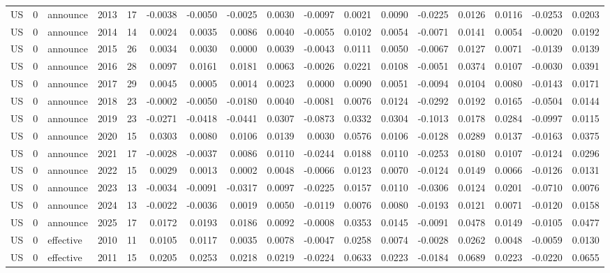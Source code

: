\begin{tabular}{lrlrrrrrrrrrrrrrr}
US & 0 & announce & 2013 & 17 & -0.0038 & -0.0050 & -0.0025 & 0.0030 & -0.0097 & 0.0021 & 0.0090 & -0.0225 & 0.0126 & 0.0116 & -0.0253 & 0.0203 \\
US & 0 & announce & 2014 & 14 & 0.0024 & 0.0035 & 0.0086 & 0.0040 & -0.0055 & 0.0102 & 0.0054 & -0.0071 & 0.0141 & 0.0054 & -0.0020 & 0.0192 \\
US & 0 & announce & 2015 & 26 & 0.0034 & 0.0030 & 0.0000 & 0.0039 & -0.0043 & 0.0111 & 0.0050 & -0.0067 & 0.0127 & 0.0071 & -0.0139 & 0.0139 \\
US & 0 & announce & 2016 & 28 & 0.0097 & 0.0161 & 0.0181 & 0.0063 & -0.0026 & 0.0221 & 0.0108 & -0.0051 & 0.0374 & 0.0107 & -0.0030 & 0.0391 \\
US & 0 & announce & 2017 & 29 & 0.0045 & 0.0005 & 0.0014 & 0.0023 & 0.0000 & 0.0090 & 0.0051 & -0.0094 & 0.0104 & 0.0080 & -0.0143 & 0.0171 \\
US & 0 & announce & 2018 & 23 & -0.0002 & -0.0050 & -0.0180 & 0.0040 & -0.0081 & 0.0076 & 0.0124 & -0.0292 & 0.0192 & 0.0165 & -0.0504 & 0.0144 \\
US & 0 & announce & 2019 & 23 & -0.0271 & -0.0418 & -0.0441 & 0.0307 & -0.0873 & 0.0332 & 0.0304 & -0.1013 & 0.0178 & 0.0284 & -0.0997 & 0.0115 \\
US & 0 & announce & 2020 & 15 & 0.0303 & 0.0080 & 0.0106 & 0.0139 & 0.0030 & 0.0576 & 0.0106 & -0.0128 & 0.0289 & 0.0137 & -0.0163 & 0.0375 \\
US & 0 & announce & 2021 & 17 & -0.0028 & -0.0037 & 0.0086 & 0.0110 & -0.0244 & 0.0188 & 0.0110 & -0.0253 & 0.0180 & 0.0107 & -0.0124 & 0.0296 \\
US & 0 & announce & 2022 & 15 & 0.0029 & 0.0013 & 0.0002 & 0.0048 & -0.0066 & 0.0123 & 0.0070 & -0.0124 & 0.0149 & 0.0066 & -0.0126 & 0.0131 \\
US & 0 & announce & 2023 & 13 & -0.0034 & -0.0091 & -0.0317 & 0.0097 & -0.0225 & 0.0157 & 0.0110 & -0.0306 & 0.0124 & 0.0201 & -0.0710 & 0.0076 \\
US & 0 & announce & 2024 & 13 & -0.0022 & -0.0036 & 0.0019 & 0.0050 & -0.0119 & 0.0076 & 0.0080 & -0.0193 & 0.0121 & 0.0071 & -0.0120 & 0.0158 \\
US & 0 & announce & 2025 & 17 & 0.0172 & 0.0193 & 0.0186 & 0.0092 & -0.0008 & 0.0353 & 0.0145 & -0.0091 & 0.0478 & 0.0149 & -0.0105 & 0.0477 \\
US & 0 & effective & 2010 & 11 & 0.0105 & 0.0117 & 0.0035 & 0.0078 & -0.0047 & 0.0258 & 0.0074 & -0.0028 & 0.0262 & 0.0048 & -0.0059 & 0.0130 \\
US & 0 & effective & 2011 & 15 & 0.0205 & 0.0253 & 0.0218 & 0.0219 & -0.0224 & 0.0633 & 0.0223 & -0.0184 & 0.0689 & 0.0223 & -0.0220 & 0.0655 \\

\end{tabular}
